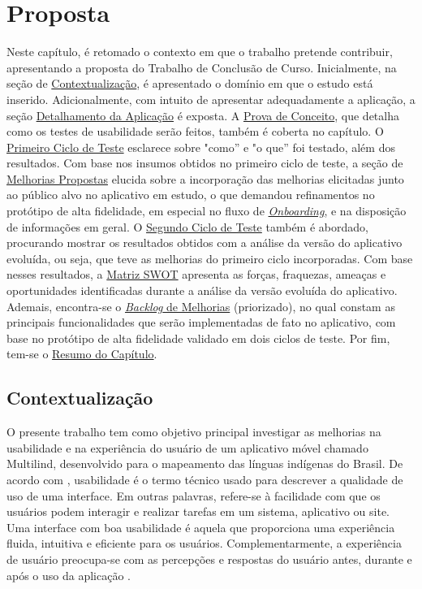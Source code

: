 \chapter[Proposta]{Proposta}
\label{chap:Proposta}
Neste capítulo, é retomado o contexto em que o trabalho pretende contribuir, apresentando a proposta do Trabalho de Conclusão de Curso. Inicialmente, na seção de \hyperref[sec:Contextualização]{Contextualização}, é 
apresentado o domínio em que o estudo está inserido. Adicionalmente, com intuito de apresentar adequadamente a aplicação, a seção \hyperref[sec:Detalhamento da Aplicacao]{Detalhamento da Aplicação} é exposta. A \hyperref[sec:Prova de Conceito]{Prova de Conceito}, 
que detalha como os testes de usabilidade serão  feitos, também é coberta no capítulo. O \hyperref[sec:Primeiro Ciclo]{Primeiro Ciclo de Teste} esclarece sobre "como'' e "o que'' foi testado, além dos resultados. Com base nos insumos obtidos no primeiro ciclo de teste, 
a seção de \hyperref[sec:Melhorias Propostas]{Melhorias Propostas} elucida sobre a incorporação das melhorias elicitadas junto ao público alvo no aplicativo em estudo, o que demandou refinamentos no protótipo de alta fidelidade, em especial no fluxo de \hyperref[sec:Onboarding]{\textit{Onboarding}}, 
e na disposição de informações em geral. O \hyperref[sec:Segundo Ciclo]{Segundo Ciclo de Teste} também é abordado, procurando mostrar os resultados obtidos com a análise da versão do aplicativo evoluída, ou seja, que teve as melhorias do primeiro ciclo incorporadas. 
Com base nesses resultados, a \hyperref[sec:Matriz SWOT]{Matriz SWOT} apresenta as forças, fraquezas, ameaças e oportunidades identificadas durante a análise da versão evoluída do aplicativo. Ademais, encontra-se o \hyperref[sec:Backlog]{\textit{Backlog} de Melhorias} 
(priorizado), no qual constam as principais funcionalidades que serão implementadas de fato no aplicativo, com base no protótipo de alta fidelidade validado em dois ciclos de teste. 
Por fim, tem-se o \hyperref[sec:Resumo Proposta]{Resumo do Capítulo}.

\section{Contextualização}
\label{sec:Contextualizacao}
O presente trabalho tem como objetivo principal investigar as melhorias na usabilidade e na experiência do usuário de um aplicativo móvel chamado Multilind, desenvolvido para o mapeamento das línguas indígenas do Brasil. 
De acordo com , usabilidade é o termo técnico usado para descrever a qualidade de uso de uma interface. Em outras palavras, refere-se à facilidade com que os usuários podem interagir e realizar 
tarefas em um sistema, aplicativo ou site. Uma interface com boa usabilidade é aquela que proporciona uma experiência fluida, intuitiva e eficiente para os usuários. Complementarmente, a experiência de usuário preocupa-se 
com as percepções e respostas do usuário antes, durante e após o uso da aplicação \cite{iso9241210}.

